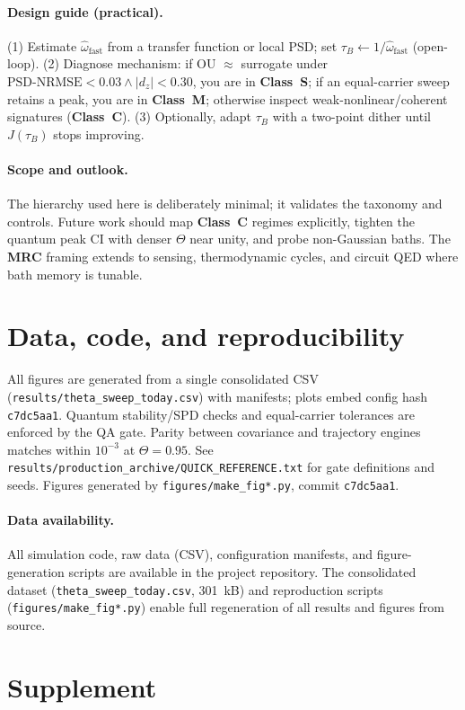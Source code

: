 \documentclass[11pt,letterpaper]{article}
\newcommand{\confighash}{c7dc5aa1}
\DeclareRobustCommand{\mrc}{\textbf{MRC}\xspace}
\DeclareRobustCommand{\classS}{\textbf{Class~S}\xspace}
\DeclareRobustCommand{\classC}{\textbf{Class~C}\xspace}
\DeclareRobustCommand{\classM}{\textbf{Class~M}\xspace}
\DeclareRobustCommand{\GatePSD}{\ensuremath{\text{PSD-NRMSE}<0.03}\xspace}
\DeclareRobustCommand{\GateDZ}{\ensuremath{\lvert d_z\rvert<0.30}\xspace}
\DeclareRobustCommand{\GateEQ}{\ensuremath{\GatePSD \wedge \GateDZ}\xspace}
\begin{document}
\paragraph*{Design guide (practical).}
(1) Estimate $\hat{\omega}_{\mathrm{fast}}$ from a transfer function or local PSD; set $\tau_B\leftarrow 1/\hat{\omega}_{\mathrm{fast}}$ (open-loop).
(2) Diagnose mechanism: if OU $\approx$ surrogate under \GateEQ, you are in \classS; if an equal-carrier sweep retains a peak, you are in \classM; otherwise inspect weak-nonlinear/coherent signatures (\classC).
(3) Optionally, adapt $\tau_B$ with a two-point dither until $J(\tau_B)$ stops improving.

\paragraph*{Scope and outlook.}
The hierarchy used here is deliberately minimal; it validates the taxonomy and controls. Future work should map \classC{} regimes explicitly, tighten the quantum peak CI with denser $\Theta$ near unity, and probe non-Gaussian baths. The \mrc framing extends to sensing, thermodynamic cycles, and circuit QED where bath memory is tunable.

\section*{Data, code, and reproducibility}
All figures are generated from a single consolidated CSV (\texttt{results/theta\_sweep\_today.csv}) with manifests; plots embed config hash \texttt{\confighash}. Quantum stability/SPD checks and equal-carrier tolerances are enforced by the QA gate. Parity between covariance and trajectory engines matches within $10^{-3}$ at $\Theta=0.95$. See \texttt{results/production\_archive/QUICK\_REFERENCE.txt} for gate definitions and seeds. Figures generated by \texttt{figures/make\_fig*.py}, commit \texttt{\confighash}.

\paragraph*{Data availability.} All simulation code, raw data (CSV), configuration manifests, and figure-generation scripts are available in the project repository. The consolidated dataset (\texttt{theta\_sweep\_today.csv}, 301~kB) and reproduction scripts (\texttt{figures/make\_fig*.py}) enable full regeneration of all results and figures from source.

\section*{Supplement}
\end{document}
